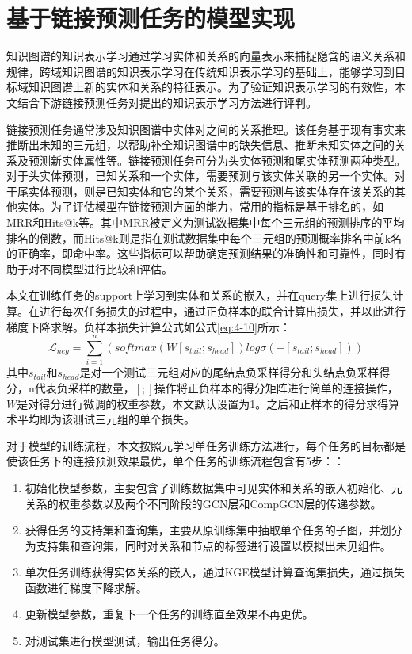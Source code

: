 \section{基于链接预测任务的模型实现}
知识图谱的知识表示学习通过学习实体和关系的向量表示来捕捉隐含的语义关系和规律，跨域知识图谱的知识表示学习在传统知识表示学习的基础上，能够学习到目标域知识图谱上新的实体和关系的特征表示。为了验证知识表示学习的有效性，本文结合下游链接预测任务对提出的知识表示学习方法进行评判。

链接预测任务通常涉及知识图谱中实体对之间的关系推理。该任务基于现有事实来推断出未知的三元组，以帮助补全知识图谱中的缺失信息、推断未知实体之间的关系及预测新实体属性等。链接预测任务可分为头实体预测和尾实体预测两种类型。对于头实体预测，已知关系和一个实体，需要预测与该实体关联的另一个实体。对于尾实体预测，则是已知实体和它的某个关系，需要预测与该实体存在该关系的其他实体。为了评估模型在链接预测方面的能力，常用的指标是基于排名的，如MRR和Hits@k等。其中MRR被定义为测试数据集中每个三元组的预测排序的平均排名的倒数，而Hits@k则是指在测试数据集中每个三元组的预测概率排名中前k名的正确率，即命中率。这些指标可以帮助确定预测结果的准确性和可靠性，同时有助于对不同模型进行比较和评估。

本文在训练任务的support上学习到实体和关系的嵌入，并在query集上进行损失计算。在进行每次任务损失的过程中，通过正负样本的联合计算出损失，并以此进行梯度下降求解。负样本损失计算公式如公式\ref{eq:4-10}所示：
\begin{equation}
  \mathcal{L}_{neg} = \sum_{i = 1}^{n} \left( softmax(W[s_{tail};s_{head}])log \sigma (- [s_{tail};s_{head}]) \right) \label{eq:4-10}
\end{equation}
其中\(s_{tail}\)和\(s_{head}\)是对一个测试三元组对应的尾结点负采样得分和头结点负采样得分，n代表负采样的数量，\([;]\)操作将正负样本的得分矩阵进行简单的连接操作，\(W\)是对得分进行微调的权重参数，本文默认设置为1。之后和正样本的得分求得算术平均即为该测试三元组的单个损失。

对于模型的训练流程，本文按照元学习单任务训练方法进行，每个任务的目标都是使该任务下的连接预测效果最优，单个任务的训练流程包含有5步：：

\begin{enumerate}[label=\arabic*)]
  \item 初始化模型参数，主要包含了训练数据集中可见实体和关系的嵌入初始化、元关系的权重参数以及两个不同阶段的GCN层和CompGCN层的传递参数。
  \item 获得任务的支持集和查询集，主要从原训练集中抽取单个任务的子图，并划分为支持集和查询集，同时对关系和节点的标签进行设置以模拟出未见组件。
  \item 单次任务训练获得实体关系的嵌入，通过KGE模型计算查询集损失，通过损失函数进行梯度下降求解。
  \item 更新模型参数，重复下一个任务的训练直至效果不再更优。
  \item 对测试集进行模型测试，输出任务得分。
\end{enumerate}


